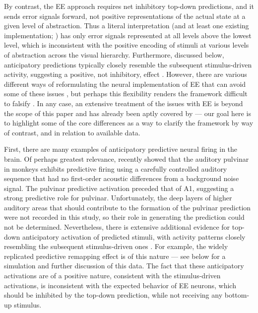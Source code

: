 \documentclass[11pt,twoside]{article}
\newif\myifpdf
\begin{document}
By contrast, the EE approach requires net inhibitory top-down predictions, and it sends error signals forward, not positive representations of the actual state at a given level of abstraction.  Thus a literal interpretation (and at least one existing implementation; \citealp{LotterKreimanCox16}) has only error signals represented at all levels above the lowest level, which is inconsistent with the positive encoding of stimuli at various levels of abstraction across the visual hierarchy.  Furthermore, discussed below, anticipatory predictions typically closely resemble the subsequent stimulus-driven activity, suggesting a positive, not inhibitory, effect  \citep{DuhamelColbyGoldberg92,LeeMumford03,CavanaghHuntAfrazEtAl10,WalshMcGovernClarkEtAl20}.  However, there are various different ways of reformulating the neural implementation of EE that can avoid some of these issues \citep{Spratling08,BastosUsreyAdamsEtAl12}, but perhaps this flexibility renders the framework difficult to falsify \citep{KogoTrengove15}.  In any case, an extensive treatment of the issues with EE is beyond the scope of this paper and has already been aptly covered by \citet{WalshMcGovernClarkEtAl20} --- our goal here is to highlight some of the core differences as a way to clarify the framework by way of contrast, and in relation to available data.

First, there are many examples of anticipatory predictive neural firing in the brain.  Of perhaps greatest relevance, \citet{BarczakOConnellMcGinnisEtAl18} recently showed that the auditory pulvinar in monkeys exhibits predictive firing using a carefully controlled auditory sequence that had no first-order acoustic differences from a background noise signal.  The pulvinar predictive activation preceded that of A1, suggesting a strong predictive role for pulvinar.  Unfortunately, the deep layers of higher auditory areas that should contribute to the formation of the pulvinar prediction were not recorded in this study, so their role in generating the prediction could not be determined.  Nevertheless, there is extensive additional evidence for top-down anticipatory activation of predicted stimuli, with activity patterns closely resembling the subsequent stimulus-driven ones \citep{WalshMcGovernClarkEtAl20}.  For example, the widely replicated predictive remapping effect is of this nature \citep{DuhamelColbyGoldberg92,Wurtz08,CavanaghHuntAfrazEtAl10} --- see below for a simulation and further discussion of this data.  The fact that these anticipatory activations are of a positive nature, consistent with the stimulus-driven activations, is inconsistent with the expected behavior of EE neurons, which should be inhibited by the top-down prediction, while not receiving any bottom-up stimulus.
\end{document}
